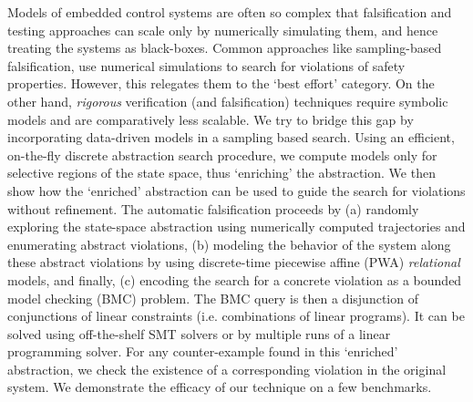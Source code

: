 Models of embedded control systems are often so complex that
falsification and testing approaches can scale only by numerically
simulating them, and hence treating the systems as black-boxes. Common
approaches like sampling-based falsification, use numerical
simulations to search for violations of safety properties. However,
this relegates them to the `best effort' category. On the other hand,
\emph{rigorous} verification (and falsification) techniques require
symbolic models and are comparatively less scalable. We try to bridge
this gap by incorporating data-driven models in a sampling based
search. Using an efficient, on-the-fly discrete abstraction
search procedure, we compute models only for selective regions of the state
space, thus `enriching' the abstraction. We then show how the
`enriched' abstraction can be used to guide the search for violations
without refinement.
The automatic falsification proceeds by (a) randomly exploring the
state-space abstraction using numerically computed trajectories and
enumerating abstract violations, (b) modeling the behavior of the
system along these abstract violations by using discrete-time
piecewise affine (PWA) \emph{relational} models, and finally, (c)
encoding the search for a concrete violation as a bounded model
checking (BMC) problem.  The BMC query is then a disjunction of
conjunctions of linear constraints (i.e. combinations of linear
programs). It can be solved using off-the-shelf SMT solvers or by
multiple runs of a linear programming solver. For any counter-example
found in this `enriched' abstraction, we check the existence of a
corresponding violation in the original system. We demonstrate the
efficacy of our technique on a few benchmarks.

